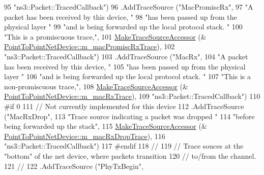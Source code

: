 \begin{DoxyCode}
95                      \textcolor{stringliteral}{"ns3::Packet::TracedCallback"})
96     .AddTraceSource (\textcolor{stringliteral}{"MacPromiscRx"}, 
97                      \textcolor{stringliteral}{"A packet has been received by this device, "}
98                      \textcolor{stringliteral}{"has been passed up from the physical layer "}
99                      \textcolor{stringliteral}{"and is being forwarded up the local protocol stack.  "}
100                      \textcolor{stringliteral}{"This is a promiscuous trace,"},
101                      \hyperlink{group__tracing_gab21a770b9855af4e8f69f7531ea4a6b0}{MakeTraceSourceAccessor} (&
      \hyperlink{classns3_1_1PointToPointNetDevice_a12dd8c413178e96b65bf9d05bedb1c0a}{PointToPointNetDevice::m\_macPromiscRxTrace}),
102                      \textcolor{stringliteral}{"ns3::Packet::TracedCallback"})
103     .AddTraceSource (\textcolor{stringliteral}{"MacRx"}, 
104                      \textcolor{stringliteral}{"A packet has been received by this device, "}
105                      \textcolor{stringliteral}{"has been passed up from the physical layer "}
106                      \textcolor{stringliteral}{"and is being forwarded up the local protocol stack.  "}
107                      \textcolor{stringliteral}{"This is a non-promiscuous trace,"},
108                      \hyperlink{group__tracing_gab21a770b9855af4e8f69f7531ea4a6b0}{MakeTraceSourceAccessor} (&
      \hyperlink{classns3_1_1PointToPointNetDevice_a1b4ac13e16c7028bbb1593f2fca53280}{PointToPointNetDevice::m\_macRxTrace}),
109                      \textcolor{stringliteral}{"ns3::Packet::TracedCallback"})
110 \textcolor{preprocessor}{#if 0}
111     \textcolor{comment}{// Not currently implemented for this device}
112     .AddTraceSource (\textcolor{stringliteral}{"MacRxDrop"}, 
113                      \textcolor{stringliteral}{"Trace source indicating a packet was dropped "}
114                      \textcolor{stringliteral}{"before being forwarded up the stack"},
115                      \hyperlink{group__tracing_gab21a770b9855af4e8f69f7531ea4a6b0}{MakeTraceSourceAccessor} (&
      \hyperlink{classns3_1_1PointToPointNetDevice_a1d633e87fb40bb21f4da7cd9c72ac17f}{PointToPointNetDevice::m\_macRxDropTrace}),
116                      \textcolor{stringliteral}{"ns3::Packet::TracedCallback"})
117 \textcolor{preprocessor}{#endif}
118     \textcolor{comment}{//}
119     \textcolor{comment}{// Trace souces at the "bottom" of the net device, where packets transition}
120     \textcolor{comment}{// to/from the channel.}
121     \textcolor{comment}{//}
122     .AddTraceSource (\textcolor{stringliteral}{"PhyTxBegin"}, 

\end{DoxyCode}
